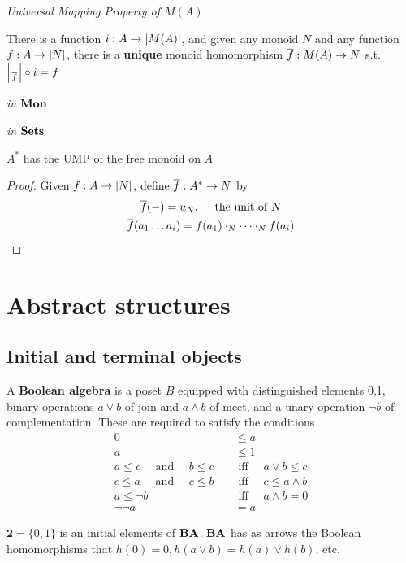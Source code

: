 \documentclass[11pt]{article}
\begin{document}
\emph{Universal Mapping Property of \(M(A)\)}

There is a function \(i:A\to\abs{M(A)}\), and given any monoid \(N\) and any
function \(f:A\to\abs{N}\), there is a \textbf{unique} monoid homomorphism
\(\overline{f}:M(A)\to N\) s.t. \(\abs{\over{f}}\circ i=f\)

\emph{in} \(\operatorname{\textbf{Mon}}\)
\begin{center}\end{center}

\emph{in} \(\operatorname{\textbf{Sets}}\)
\begin{center}\end{center}
\begin{proposition}[]
\(A^*\) has the UMP of the free monoid on \(A\)
\end{proposition}

\begin{proof}
Given \(f:A\to\abs{N}\), define \(\overline{f}:A^*\to N\) by
\begin{gather*}
\overline{f}(-)=u_N,\quad\text{ the unit of } N\\
\overline{f}(a_1\dots a_i)=f(a_1)\cdot_N\dots\cdot_N f(a_i)
\end{gather*}
\end{proof}


\section{Abstract structures}
\label{sec:orgefd690f}

\subsection{Initial and terminal objects}
\label{sec:org73d809c}
\begin{examplle}[]
A \textbf{Boolean algebra} is a poset \(B\) equipped with distinguished elements 0,1,
binary operations \(a\vee b\) of join and \(a\wedge b\) of meet, and a unary
operation \(\neg b\) of complementation. These are required to satisfy the
conditions
\begin{align*}
0&\le a\\
a&\le 1\\
a\le c \quad\text{ and }\quad b\le c \quad&\text{ iff }\quad a\vee b\le c\\
c\le a \quad\text{ and }\quad c\le b \quad&\text{ iff }\quad c\le a\wedge b\\
a\le\neg b \quad&\text{ iff }\quad a\wedge b=0\\
\neg\neg a&=a
\end{align*}

\(\textbf{2}=\{0,1\}\) is an initial elements of \(\operatorname{\textbf{BA}}\). \(\operatorname{\textbf{BA}}\) has as
arrows the Boolean homomorphisms that \(h(0)=0,h(a\vee b)=h(a)\vee h(b)\), etc.
\end{examplle}
\end{document}
